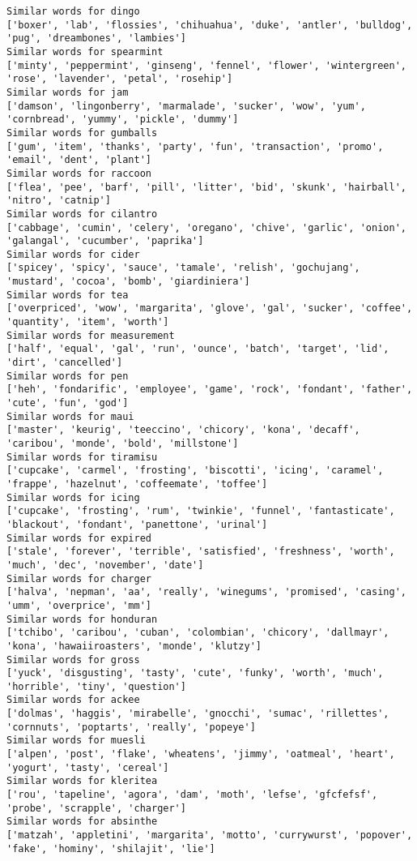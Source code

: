 \documentclass[11pt]{article}
\begin{document}
\begin{Verbatim}[commandchars=\\\{\}]
Similar words for dingo
['boxer', 'lab', 'flossies', 'chihuahua', 'duke', 'antler', 'bulldog', 'pug', 'dreambones', 'lambies']
Similar words for spearmint
['minty', 'peppermint', 'ginseng', 'fennel', 'flower', 'wintergreen', 'rose', 'lavender', 'petal', 'rosehip']
Similar words for jam
['damson', 'lingonberry', 'marmalade', 'sucker', 'wow', 'yum', 'cornbread', 'yummy', 'pickle', 'dummy']
Similar words for gumballs
['gum', 'item', 'thanks', 'party', 'fun', 'transaction', 'promo', 'email', 'dent', 'plant']
Similar words for raccoon
['flea', 'pee', 'barf', 'pill', 'litter', 'bid', 'skunk', 'hairball', 'nitro', 'catnip']
Similar words for cilantro
['cabbage', 'cumin', 'celery', 'oregano', 'chive', 'garlic', 'onion', 'galangal', 'cucumber', 'paprika']
Similar words for cider
['spicey', 'spicy', 'sauce', 'tamale', 'relish', 'gochujang', 'mustard', 'cocoa', 'bomb', 'giardiniera']
Similar words for tea
['overpriced', 'wow', 'margarita', 'glove', 'gal', 'sucker', 'coffee', 'quantity', 'item', 'worth']
Similar words for measurement
['half', 'equal', 'gal', 'run', 'ounce', 'batch', 'target', 'lid', 'dirt', 'cancelled']
Similar words for pen
['heh', 'fondarific', 'employee', 'game', 'rock', 'fondant', 'father', 'cute', 'fun', 'god']
Similar words for maui
['master', 'keurig', 'teeccino', 'chicory', 'kona', 'decaff', 'caribou', 'monde', 'bold', 'millstone']
Similar words for tiramisu
['cupcake', 'carmel', 'frosting', 'biscotti', 'icing', 'caramel', 'frappe', 'hazelnut', 'coffeemate', 'toffee']
Similar words for icing
['cupcake', 'frosting', 'rum', 'twinkie', 'funnel', 'fantasticate', 'blackout', 'fondant', 'panettone', 'urinal']
Similar words for expired
['stale', 'forever', 'terrible', 'satisfied', 'freshness', 'worth', 'much', 'dec', 'november', 'date']
Similar words for charger
['halva', 'nepman', 'aa', 'really', 'winegums', 'promised', 'casing', 'umm', 'overprice', 'mm']
Similar words for honduran
['tchibo', 'caribou', 'cuban', 'colombian', 'chicory', 'dallmayr', 'kona', 'hawaiiroasters', 'monde', 'klutzy']
Similar words for gross
['yuck', 'disgusting', 'tasty', 'cute', 'funky', 'worth', 'much', 'horrible', 'tiny', 'question']
Similar words for ackee
['dolmas', 'haggis', 'mirabelle', 'gnocchi', 'sumac', 'rillettes', 'cornnuts', 'poptarts', 'really', 'popeye']
Similar words for muesli
['alpen', 'post', 'flake', 'wheatens', 'jimmy', 'oatmeal', 'heart', 'yogurt', 'tasty', 'cereal']
Similar words for kleritea
['rou', 'tapeline', 'agora', 'dam', 'moth', 'lefse', 'gfcfefsf', 'probe', 'scrapple', 'charger']
Similar words for absinthe
['matzah', 'appletini', 'margarita', 'motto', 'currywurst', 'popover', 'fake', 'hominy', 'shilajit', 'lie']

\end{Verbatim}
\end{document}
